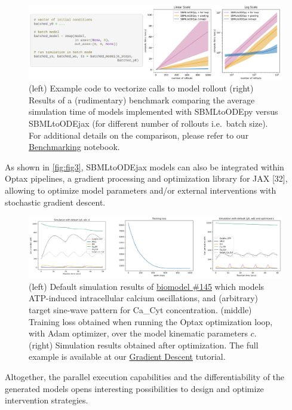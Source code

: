 \documentclass[
]{article}
\begin{document}
\begin{figure}
\centering
\includegraphics[width=1\textwidth,height=\textheight]{fig2.png}
\caption{(left) Example code to vectorize calls to model rollout (right)
Results of a (rudimentary) benchmark comparing the average simulation
time of models implemented with SBMLtoODEpy versus SBMLtoODEjax (for
different number of rollouts i.e.~batch size). For additional details on
the comparison, please refer to our
\href{https://developmentalsystems.org/sbmltoodejax/tutorials/benchmark.html}{Benchmarking}
notebook. \label{fig:fig2}}
\end{figure}

As shown in \autoref{fig:fig3}, SBMLtoODEjax models can also be
integrated within Optax pipelines, a gradient processing and
optimization library for JAX {[}32{]}, allowing to optimize model
parameters and/or external interventions with stochastic gradient
descent.

\begin{figure}
\centering
\includegraphics[width=1\textwidth,height=\textheight]{fig3.png}
\caption{(left) Default simulation results of
\href{https://www.ebi.ac.uk/biomodels/BIOMD0000000145}{biomodel \#145}
which models ATP-induced intracellular calcium oscillations, and
(arbitrary) target sine-wave pattern for Ca\_Cyt concentration. (middle)
Training loss obtained when running the Optax optimization loop, with
Adam optimizer, over the model kinematic parameters \(c\). (right)
Simulation results obtained after optimization. The full example is
available at our
\href{https://developmentalsystems.org/sbmltoodejax/tutorials/gradient_descent.html}{Gradient
Descent} tutorial. \label{fig:fig3}}
\end{figure}

Altogether, the parallel execution capabilities and the
differentiability of the generated models opens interesting
possibilities to design and optimize intervention strategies.
\end{document}

